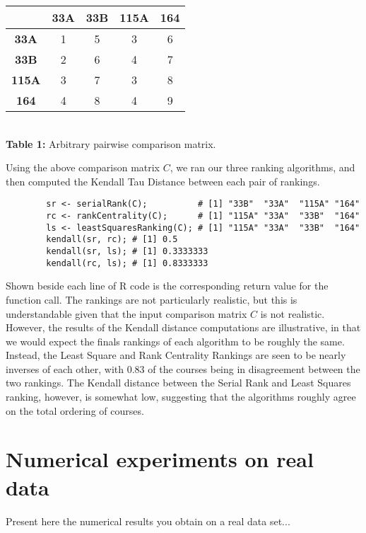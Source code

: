 \documentclass[10pt]{siamltex}
\begin{document}
\begin{pagewiselinenumbers}
\begin{center}
\begin{table}
\end{table}
\begin{tabular}{ c | c | c | c | c}
& \textbf{33A} & \textbf{33B} & \textbf{115A} & \textbf{164}\\\hline
\textbf{33A}    & 1 & 5  & 3 & 6\\
\textbf{33B}    & 2 & 6  & 4 & 7\\
\textbf{115A} &  3 & 7 & 3 & 8\\
\textbf{164}    &  4 & 8 & 4 & 9\\
\end{tabular}
\\\textbf{Table 1:} Arbitrary pairwise comparison matrix. 
\end{center}

Using the above comparison matrix $C$, we ran our three ranking algorithms, and then computed the Kendall Tau Distance between each pair of rankings.\\

\begin{verbatim}
        sr <- serialRank(C);          # [1] "33B"  "33A"  "115A" "164" 
        rc <- rankCentrality(C);      # [1] "115A" "33A"  "33B"  "164" 
        ls <- leastSquaresRanking(C); # [1] "115A" "33A"  "33B"  "164"
        kendall(sr, rc); # [1] 0.5
        kendall(sr, ls); # [1] 0.3333333
        kendall(rc, ls); # [1] 0.8333333
\end{verbatim}

Shown beside each line of R code is the corresponding return value for the function call. The rankings are not particularly realistic, but this is understandable given that the input comparison matrix $C$ is not realistic. However, the results of the Kendall distance computations are illustrative, in that we would expect the finals rankings of each algorithm to be roughly the same. Instead, the Least Square and Rank Centrality Rankings are seen to be nearly inverses of each other, with 0.83 of the courses being in disagreement between the two rankings. The Kendall distance between the Serial Rank and Least Squares ranking, however, is somewhat low, suggesting that the algorithms roughly agree on the total ordering of courses.

\section{Numerical experiments on real data}   \label{sec:NumExpReal}
Present here the numerical results you obtain on a real data set...


\end{pagewiselinenumbers}
\end{document}
